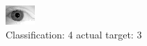 \begin{figure}[h!]
\begin{center}
\includegraphics[width=0.60\columnwidth]{figures/ID2081_class_4_target_3.png}
\end{center}
\caption{ Classification: 4 actual target: 3}
\label{fig:ID2081_class_4_target_3}
\end{figure}
